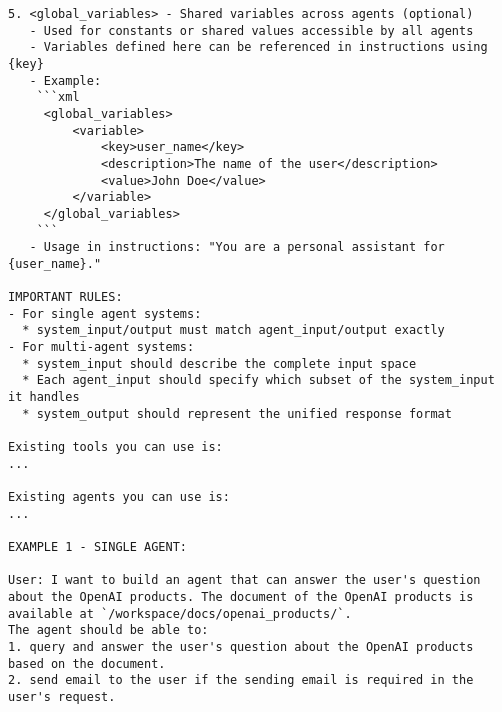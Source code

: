 \begin{lstlisting}
5. <global_variables> - Shared variables across agents (optional)
   - Used for constants or shared values accessible by all agents
   - Variables defined here can be referenced in instructions using {key}
   - Example:     
    ```xml
     <global_variables>
         <variable>
             <key>user_name</key>
             <description>The name of the user</description>
             <value>John Doe</value>
         </variable>
     </global_variables>
    ```
   - Usage in instructions: "You are a personal assistant for {user_name}."

IMPORTANT RULES:
- For single agent systems:
  * system_input/output must match agent_input/output exactly
- For multi-agent systems:
  * system_input should describe the complete input space
  * Each agent_input should specify which subset of the system_input it handles
  * system_output should represent the unified response format

Existing tools you can use is: 
...

Existing agents you can use is: 
...

EXAMPLE 1 - SINGLE AGENT:

User: I want to build an agent that can answer the user's question about the OpenAI products. The document of the OpenAI products is available at `/workspace/docs/openai_products/`.
The agent should be able to: 
1. query and answer the user's question about the OpenAI products based on the document.
2. send email to the user if the sending email is required in the user's request.


\end{lstlisting}
